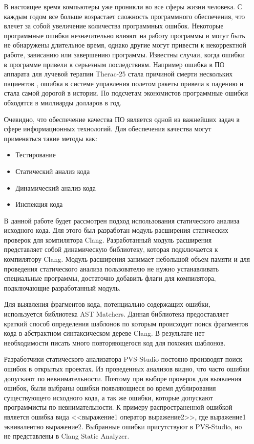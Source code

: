 \intro
В настоящее время компьютеры уже проникли во все сферы жизни человека. С каждым годом все больше
возрастает сложность программного обеспечения, что влечет за собой увеличение количества программных 
ошибок. Некоторые программные ошибки незначительно влияют на работу программы и могут быть
не обнаружены длительное время, однако другие могут привести к некорректной работе, зависанию или
завершению программы. Известны случаи, когда ошибки в программе привели к серьезным последствиям.
Например ошибка в ПО аппарата для лучевой терапии Therac-25 стала причиной смерти 
нескольких пациентов \cite{therac}, ошибка в системе управления полетом ракеты привела к падению
и стала самой дорогой в истории\cite{ariane}. По подсчетам экономистов программные ошибки обходятся в миллиарды долларов в год. 

Очевидно, что обеспечение качества ПО является одной из важнейших задач в сфере информационных технологий.
Для обеспечения качества могут применяться такие методы как:
\begin{itemize}
	\item Тестирование
	\item Статический анализ кода
	\item Динамический анализ кода
	\item Инспекция кода
\end{itemize}

В данной работе будет рассмотрен подход использования статического анализа исходного кода.
Для этого был разработан модуль расширения статических проверок для компилятора Clang. Разработанный 
модуль расширения представляет собой динамическую библиотеку, которая подключается к компилятору 
Clang. Модуль расширения занимает небольшой объем памяти и для проведения статического анализа 
пользователю не нужно устанавливать специальные программы, достаточно добавить флаги для компилятора, 
подключающие разработанный модуль. 

Для выявления фрагментов кода, потенциально содержащих ошибки, используется библиотека AST Matchers.
Данная библиотека предоставляет краткий способ определения шаблонов по которым происходит 
поиск фрагментов кода в абстрактном синтаксическом дереве Clang. В результате нет необходимости писать 
много повторяющегося код для похожих шаблонов.

Разработчики статического анализатора PVS-Studio постояно производят поиск ошибок в открытых проектах.
Из проведенных анализов видно, что часто ошибки допускают по невнимательности.
Поэтому при выборе проверок для выявления ошибок, были выбраны ошибки появляющиеся во время дублирования 
существующего исходного кода, а так же ошибки, которые допускают программисты по невнимательности.
К примеру распространенной ошибкой является ошибка вида <<выражение1 оператор выражение2>>, где
выражение1 эквивалентно выражение2. 
Выбранные ошибки присутствуют в PVS-Studio, но не представлены в Clang Static Analyzer.
